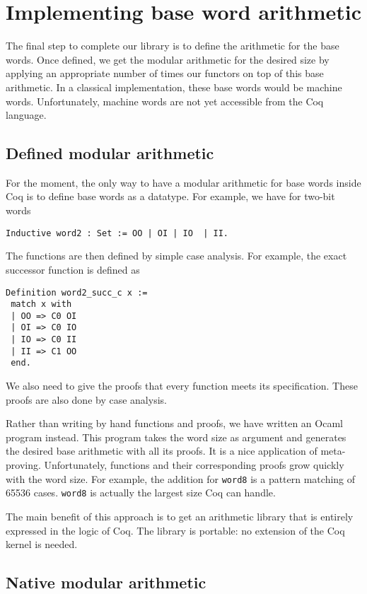 \section{Implementing base word arithmetic \label{word}}

The final step to complete our library is to define the arithmetic for the 
base words. 
Once defined,  we get the modular arithmetic for the desired size by 
applying an appropriate number of times our functors on top of this base arithmetic. 
In a classical implementation, these base words would be machine words.
Unfortunately, machine words are not yet accessible from the {\sc Coq} 
language. 

\subsection{Defined modular arithmetic}

For the moment, the only way to have a modular arithmetic for base words 
inside {\sc Coq} is to define base words as a datatype. 
For example, we have for two-bit words
\begin{verbatim}
Inductive word2 : Set := OO | OI | IO  | II.
\end{verbatim}
The functions are then defined by simple case analysis. For example,
the exact successor function is defined as
\begin{verbatim}
Definition word2_succ_c x :=
 match x with
 | OO => C0 OI
 | OI => C0 IO
 | IO => C0 II
 | II => C1 OO
 end.
\end{verbatim}
We also need to give the proofs that every function meets its specification.
These proofs are also done by case analysis. 

Rather than writing by hand functions and proofs, we have
written an {\sc Ocaml}~\cite{Ocaml} program instead.
This program takes the word size as argument and generates the 
desired base arithmetic with all its proofs. 
It is a nice application of meta-proving. Unfortunately, 
functions and their corresponding proofs grow quickly with the word size. 
For example, the addition for {\tt word8} is a pattern matching of 
65536 cases. {\tt word8} is actually the largest size {\sc Coq} can handle. 

The main benefit of  this approach is to get an arithmetic library that is 
entirely expressed in the logic of {\sc Coq}. The library is portable: 
no extension of the {\sc Coq} kernel is needed. 

\subsection{Native modular arithmetic}

